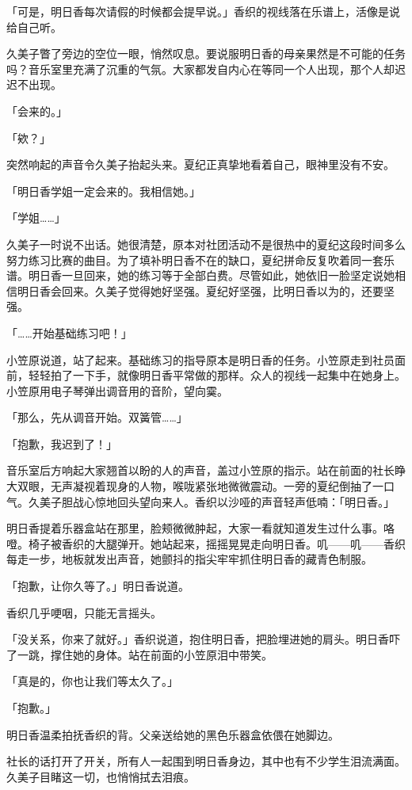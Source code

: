 \documentclass[UTF8]{ctexart}
\begin{document}
    「可是，明日香每次请假的时候都会提早说。」香织的视线落在乐谱上，活像是说给自己听。 

    久美子瞥了旁边的空位一眼，悄然叹息。要说服明日香的母亲果然是不可能的任务吗？音乐室里充满了沉重的气氛。大家都发自内心在等同一个人出现，那个人却迟迟不出现。 

    「会来的。」 

    「欸？」 

    突然响起的声音令久美子抬起头来。夏纪正真挚地看着自己，眼神里没有不安。 

    「明日香学姐一定会来的。我相信她。」 

    「学姐……」 

    久美子一时说不出话。她很清楚，原本对社团活动不是很热中的夏纪这段时间多么努力练习比赛的曲目。为了填补明日香不在的缺口，夏纪拼命反复吹着同一套乐谱。明日香一旦回来，她的练习等于全部白费。尽管如此，她依旧一脸坚定说她相信明日香会回来。久美子觉得她好坚强。夏纪好坚强，比明日香以为的，还要坚强。 

    「……开始基础练习吧！」 

    小笠原说道，站了起来。基础练习的指导原本是明日香的任务。小笠原走到社员面前，轻轻拍了一下手，就像明日香平常做的那样。众人的视线一起集中在她身上。小笠原用电子琴弹出调音用的音阶，望向霙。 

    「那么，先从调音开始。双簧管……」 

    「抱歉，我迟到了！」 

    音乐室后方响起大家翘首以盼的人的声音，盖过小笠原的指示。站在前面的社长睁大双眼，无声凝视着现身的人物，喉咙紧张地微微震动。一旁的夏纪倒抽了一口气。久美子胆战心惊地回头望向来人。香织以沙哑的声音轻声低喃：「明日香。」 

    明日香提着乐器盒站在那里，脸颊微微肿起，大家一看就知道发生过什么事。咯噔。椅子被香织的大腿弹开。她站起来，摇摇晃晃走向明日香。叽——叽——香织每走一步，地板就发出声音，她颤抖的指尖牢牢抓住明日香的藏青色制服。 

    「抱歉，让你久等了。」明日香说道。 

    香织几乎哽咽，只能无言摇头。 

    「没关系，你来了就好。」香织说道，抱住明日香，把脸埋进她的肩头。明日香吓了一跳，撑住她的身体。站在前面的小笠原泪中带笑。 

    「真是的，你也让我们等太久了。」 

    「抱歉。」 

    明日香温柔拍抚香织的背。父亲送给她的黑色乐器盒依偎在她脚边。 

    社长的话打开了开关，所有人一起围到明日香身边，其中也有不少学生泪流满面。久美子目睹这一切，也悄悄拭去泪痕。 
\end{document}
